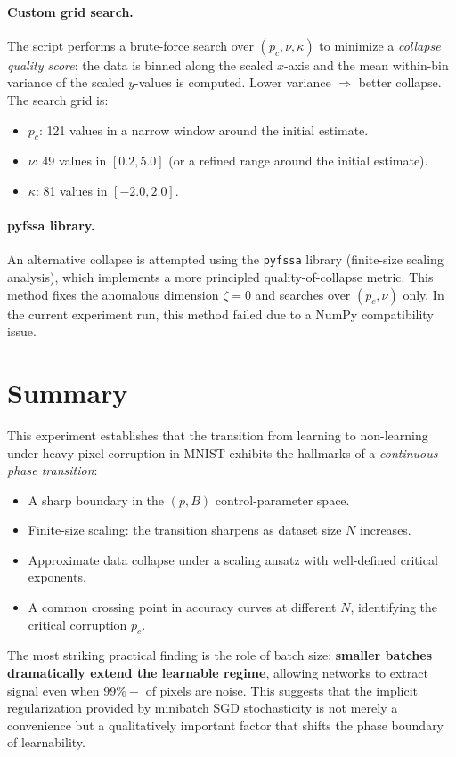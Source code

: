 \documentclass[11pt,a4paper]{article}
\begin{document}
\paragraph{Custom grid search.}
The script performs a brute-force search over $(p_c, \nu, \kappa)$ to minimize a \emph{collapse quality score}: the data is binned along the scaled $x$-axis and the mean within-bin variance of the scaled $y$-values is computed. Lower variance $\Rightarrow$ better collapse. The search grid is:
\begin{itemize}
  \item $p_c$: 121 values in a narrow window around the initial estimate.
  \item $\nu$: 49 values in $[0.2, 5.0]$ (or a refined range around the initial estimate).
  \item $\kappa$: 81 values in $[-2.0, 2.0]$.
\end{itemize}

\paragraph{pyfssa library.}
An alternative collapse is attempted using the \texttt{pyfssa} library (finite-size scaling analysis), which implements a more principled quality-of-collapse metric. This method fixes the anomalous dimension $\zeta = 0$ and searches over $(p_c, \nu)$ only. In the current experiment run, this method failed due to a NumPy compatibility issue.

\section{Summary}

This experiment establishes that the transition from learning to non-learning under heavy pixel corruption in MNIST exhibits the hallmarks of a \emph{continuous phase transition}:
\begin{itemize}
  \item A sharp boundary in the $(p, B)$ control-parameter space.
  \item Finite-size scaling: the transition sharpens as dataset size $N$ increases.
  \item Approximate data collapse under a scaling ansatz with well-defined critical exponents.
  \item A common crossing point in accuracy curves at different $N$, identifying the critical corruption $p_c$.
\end{itemize}

The most striking practical finding is the role of batch size: \textbf{smaller batches dramatically extend the learnable regime}, allowing networks to extract signal even when $99\%+$ of pixels are noise.
This suggests that the implicit regularization provided by minibatch SGD stochasticity is not merely a convenience but a qualitatively important factor that shifts the phase boundary of learnability.
\end{document}
